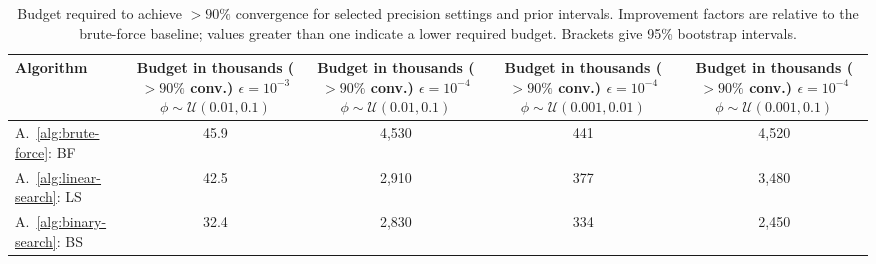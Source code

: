 \begin{table}[ht]
\centering
\scriptsize
\caption{Budget required to achieve $>90\%$ convergence for selected precision settings and prior intervals. Improvement factors are relative to the brute-force baseline; values greater than one indicate a lower required budget. Brackets give 95\% bootstrap intervals.}
\label{tab:summary-all-ci}
\begin{tabular}{l c c c c}
\toprule
Algorithm
& \makecell{Budget in thousands\\ ($>90\%$ conv.) \\ $\epsilon={10^{-3}}$ \\ $\phi \sim \mathcal{U}(0.01,0.1)$}
& \makecell{Budget in thousands\\ ($>90\%$ conv.) \\ $\epsilon={10^{-4}}$ \\ $\phi \sim \mathcal{U}(0.01,0.1)$}
& \makecell{Budget in thousands\\ ($>90\%$ conv.) \\ $\epsilon={10^{-4}}$ \\ $\phi \sim \mathcal{U}(0.001,0.01)$}
& \makecell{Budget in thousands\\ ($>90\%$ conv.) \\ $\epsilon={10^{-4}}$ \\ $\phi \sim \mathcal{U}(0.001,0.1)$} \\
\midrule
A.~\ref{alg:brute-force}: BF
& 45.9 \newline {\scriptsize [45.3, 46.5]}
& 4{,}530 \newline {\scriptsize [4{,}460, 4{,}590]}
& 441 \newline {\scriptsize [436, 447]}
& 4{,}520 \newline {\scriptsize [4{,}460, 4{,}580]} \\
A.~\ref{alg:linear-search}: LS
& 42.5 \newline {\scriptsize [41.6, 43.2]}
& 2{,}910 \newline {\scriptsize [2{,}860, 2{,}960]}
& 377 \newline {\scriptsize [374, 382]}
& 3{,}480 \newline {\scriptsize [3{,}440, 3{,}530]} \\
A.~\ref{alg:binary-search}: BS
& 32.4 \newline {\scriptsize [32, 32.9]}
& 2{,}830 \newline {\scriptsize [2{,}800, 2{,}870]}
& 334 \newline {\scriptsize [330, 338]}
& 2{,}450 \newline {\scriptsize [2{,}420, 2{,}480]} \\

\end{tabular}
\end{table}
